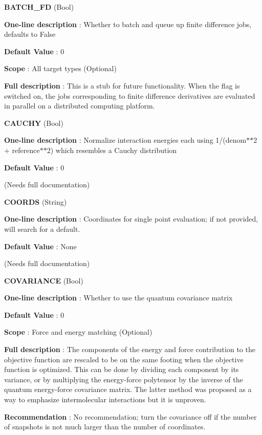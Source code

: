 \begin{DoxyItemize}
\item {\bfseries  B\-A\-T\-C\-H\-\_\-\-F\-D } (Bool) \par
{\bfseries  One-\/line description }\-: Whether to batch and queue up finite difference jobs, defaults to False \par
{\bfseries  Default Value }\-: 0 \par
{\bfseries  Scope }\-: All target types (Optional) \par
{\bfseries  Full description }\-: This is a stub for future functionality. When the flag is switched on, the jobs corresponding to finite difference derivatives are evaluated in parallel on a distributed computing platform.\end{DoxyItemize}
\begin{DoxyItemize}
\item {\bfseries  C\-A\-U\-C\-H\-Y } (Bool) \par
{\bfseries  One-\/line description }\-: Normalize interaction energies each using 1/(denom$\ast$$\ast$2 + reference$\ast$$\ast$2) which resembles a Cauchy distribution \par
{\bfseries  Default Value }\-: 0 \par
(Needs full documentation)\end{DoxyItemize}
\begin{DoxyItemize}
\item {\bfseries  C\-O\-O\-R\-D\-S } (String) \par
{\bfseries  One-\/line description }\-: Coordinates for single point evaluation; if not provided, will search for a default. \par
{\bfseries  Default Value }\-: None \par
(Needs full documentation)\end{DoxyItemize}
\begin{DoxyItemize}
\item {\bfseries  C\-O\-V\-A\-R\-I\-A\-N\-C\-E } (Bool) \par
{\bfseries  One-\/line description }\-: Whether to use the quantum covariance matrix \par
{\bfseries  Default Value }\-: 0 \par
{\bfseries  Scope }\-: Force and energy matching (Optional) \par
{\bfseries  Full description }\-: The components of the energy and force contribution to the objective function are rescaled to be on the same footing when the objective function is optimized. This can be done by dividing each component by its variance, or by multiplying the energy-\/force polytensor by the inverse of the quantum energy-\/force covariance matrix. The latter method was proposed as a way to emphasize intermolecular interactions but it is unproven. \par
{\bfseries  Recommendation }\-: No recommendation; turn the covariance off if the number of snapshots is not much larger than the number of coordinates.\end{DoxyItemize}
